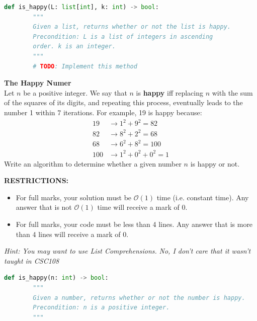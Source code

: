 \documentclass[letterpaper,12pt,addpoints]{exam}
\begin{document}
\begin{questions}
    \begin{lstlisting}[language=Python, style=mystyle]
    def is_happy(L: list[int], k: int) -> bool:
        """
        Given a list, returns whether or not the list is happy.
        Precondition: L is a list of integers in ascending 
        order. k is an integer.
        """
        # TODO: Implement this method
    \end{lstlisting}

    \clearpage
    \question[10] \textbf{The Happy Numer} \\
    Let $n$ be a positive integer. We say that $n$ is \textbf{happy} iff replacing $n$ with the sum of the squares of its digits, and repeating this process, eventually leads to the number 1 within 7 iterations. For example, 19 is happy because:
    \begin{align*}
        19 &\rightarrow 1^2 + 9^2 = 82 \\
        82 &\rightarrow 8^2 + 2^2 = 68 \\
        68 &\rightarrow 6^2 + 8^2 = 100 \\
        100 &\rightarrow 1^2 + 0^2 + 0^2 = 1
    \end{align*}
    Write an algorithm to determine whether a given number $n$ is happy or not.

    \begin{center}
        \textbf{RESTRICTIONS:}
        \begin{itemize}
            \item For full marks, your solution must be $\mathcal{O}(1)$ time (i.e. constant time). Any answer that is not $\mathcal{O}(1)$ time will receive a mark of 0.
            \item For full marks, your code must be less than 4 lines. Any answer that is more than 4 lines will receive a mark of 0.
        \end{itemize}
        \textit{Hint: You may want to use List Comprehensions.}
        \textit{No, I don't care that it wasn't taught in CSC108}
    \end{center}
    \begin{lstlisting}[language=Python, style=mystyle]
    def is_happy(n: int) -> bool:
        """
        Given a number, returns whether or not the number is happy.
        Precondition: n is a positive integer.
        """
    \end{lstlisting}


\end{questions}
\end{document}
